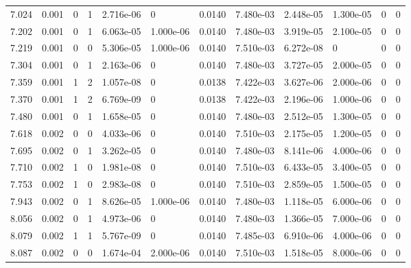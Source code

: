 \documentclass[preview]{standalone}
\begin{document}
{{{\begin{tabular}{L{1.2cm}C{1.2cm} C{0.3cm}C{0.5cm} C{1.4cm}C{1.4cm} C{1.4cm}C{1.4cm} C{1.6cm}C{1.6cm} C{1.6cm}C{1.6cm}}
  7.024  &  0.001  & 0     &  1 &  2.716e-06  & 0  &  0.0140&   7.480e-03& 2.448e-05 & 1.300e-05   &  0 & 0  \\ 
  7.202  &  0.001  & 0     &  1 &  6.063e-05  & 1.000e-06  &  0.0140&   7.480e-03& 3.919e-05 & 2.100e-05   &  0 & 0  \\ 
  7.219  &  0.001  & 0     &  0 &  5.306e-05  & 1.000e-06  &  0.0140&   7.510e-03& 6.272e-08 & 0   &  0 & 0  \\ 
  7.304  &  0.001  & 0     &  1 &  2.163e-06  & 0  &  0.0140&   7.480e-03& 3.727e-05 & 2.000e-05   &  0 & 0  \\ 
  7.359  &  0.001  & 1     &  2 &  1.057e-08  & 0  &  0.0138&   7.422e-03& 3.627e-06 & 2.000e-06   &  0 & 0  \\ 
  7.370  &  0.001  & 1     &  2 &  6.769e-09  & 0  &  0.0138&   7.422e-03& 2.196e-06 & 1.000e-06   &  0 & 0  \\ 
  7.480  &  0.001  & 0     &  1 &  1.658e-05  & 0  &  0.0140&   7.480e-03& 2.512e-05 & 1.300e-05   &  0 & 0  \\ 
  7.618  &  0.002  & 0     &  0 &  4.033e-06  & 0  &  0.0140&   7.510e-03& 2.175e-05 & 1.200e-05   &  0 & 0  \\ 
  7.695  &  0.002  & 0     &  1 &  3.262e-05  & 0  &  0.0140&   7.480e-03& 8.141e-06 & 4.000e-06   &  0 & 0  \\ 
  7.710  &  0.002  & 1     &  0 &  1.981e-08  & 0  &  0.0140&   7.510e-03& 6.433e-05 & 3.400e-05   &  0 & 0  \\ 
  7.753  &  0.002  & 1     &  0 &  2.983e-08  & 0  &  0.0140&   7.510e-03& 2.859e-05 & 1.500e-05   &  0 & 0  \\ 
  7.943  &  0.002  & 0     &  1 &  8.626e-05  & 1.000e-06  &  0.0140&   7.480e-03& 1.118e-05 & 6.000e-06   &  0 & 0  \\ 
  8.056  &  0.002  & 0     &  1 &  4.973e-06  & 0  &  0.0140&   7.480e-03& 1.366e-05 & 7.000e-06   &  0 & 0  \\ 
  8.079  &  0.002  & 1     &  1 &  5.767e-09  & 0  &  0.0140&   7.485e-03& 6.910e-06 & 4.000e-06   &  0 & 0  \\ 
  8.087  &  0.002  & 0     &  0 &  1.674e-04  & 2.000e-06  &  0.0140&   7.510e-03& 1.518e-05 & 8.000e-06   &  0 & 0  \\ 
\hline 
\end{tabular} 

}}}
\end{document}
